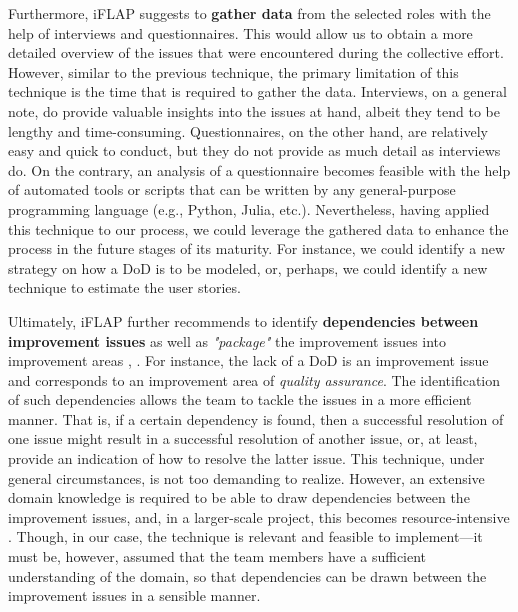 \documentclass[conference]{IEEEtran}
\begin{document}
Furthermore, iFLAP suggests to \textbf{gather data} from the selected roles
with the help of interviews and questionnaires. This would allow us to obtain
a more detailed overview of the issues that were encountered during the collective
effort. However, similar to the previous technique, the primary limitation of
this technique is the time that is required to gather the data. Interviews, on
a general note, do provide valuable insights into the issues at hand, albeit
they tend to be lengthy and time-consuming. Questionnaires, on the other hand,
are relatively easy and quick to conduct, but they do not provide as much
detail as interviews do. On the contrary, an analysis of a questionnaire
becomes feasible with the help of automated tools or scripts that can be
written by any general-purpose programming language (e.g., Python, Julia,
etc.). Nevertheless, having applied this technique to our process, we could
leverage the gathered data to enhance the process in the future stages of its
maturity. For instance, we could identify a new strategy on how a DoD is to be
modeled, or, perhaps, we could identify a new technique to estimate the user
stories.

Ultimately, iFLAP further recommends to identify \textbf{dependencies between
improvement issues} as well as \textit{"package"} the improvement issues into
improvement areas \cite{Pettersson2008}, \cite{Malvius2009}. For instance, the
lack of a DoD is an improvement issue and corresponds to an improvement area of
\textit{quality assurance}. The identification of such dependencies allows the
team to tackle the issues in a more efficient manner. That is, if a certain
dependency is found, then a successful resolution of one issue might result in
a successful resolution of another issue, or, at least, provide an indication
of how to resolve the latter issue. This technique, under general
circumstances, is not too demanding to realize. However, an extensive domain
knowledge is required to be able to draw dependencies between the improvement
issues, and, in a larger-scale project, this becomes resource-intensive
\cite{Pettersson2008}. Though, in our case, the technique is relevant and
feasible to implement---it must be, however, assumed that the team members have
a sufficient understanding of the domain, so that dependencies can be drawn
between the improvement issues in a sensible manner.

\end{document}
